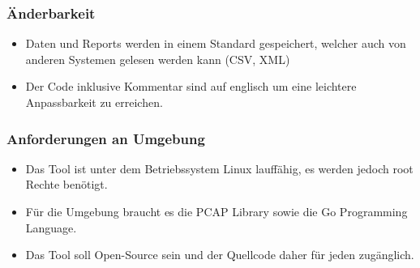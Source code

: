\subsubsection{Änderbarkeit}
\begin{itemize}
\item Daten und Reports werden in einem Standard gespeichert, welcher auch von anderen Systemen gelesen werden kann (CSV, XML)
\item Der Code inklusive Kommentar sind auf englisch um eine leichtere Anpassbarkeit zu erreichen.
\end{itemize}

\subsubsection{Anforderungen an Umgebung}
\begin{itemize}
\item Das Tool ist unter dem Betriebssystem Linux lauffähig, es werden jedoch root Rechte benötigt.
\item Für die Umgebung braucht es die \acs{PCAP} Library sowie die Go Programming Language.
\item Das Tool soll Open-Source sein und der Quellcode daher für jeden zugänglich.
\end{itemize}